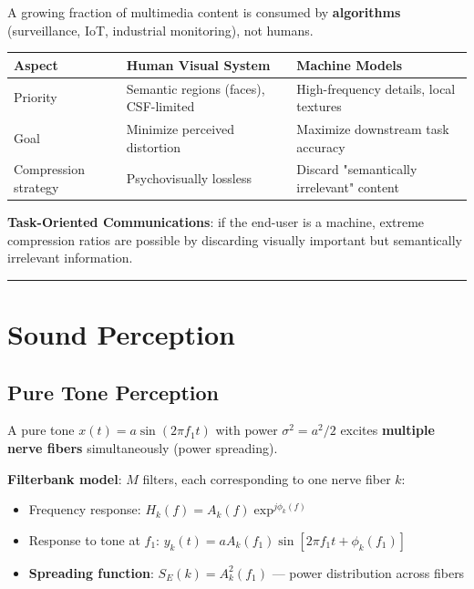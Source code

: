 A growing fraction of multimedia content is consumed by \textbf{algorithms} (surveillance, IoT, industrial monitoring), not humans.

\begin{center}
\begin{tabular}{|l|l|l|}
\hline
\textbf{Aspect} & \textbf{Human Visual System} & \textbf{Machine Models} \\ \hline
Priority & Semantic regions (faces), CSF-limited & High-frequency details, local textures \\ \hline
Goal & Minimize perceived distortion & Maximize downstream task accuracy \\ \hline
Compression strategy & Psychovisually lossless & Discard "semantically irrelevant" content \\ \hline
\end{tabular}
\end{center}

\textbf{Task-Oriented Communications}: if the end-user is a machine, extreme compression ratios are possible by discarding visually important but semantically irrelevant information.

\bigskip\hrule\bigskip

\section{Sound Perception}

\subsection{Pure Tone Perception}

A pure tone $x(t) = a\sin(2\pi f_1 t)$ with power $\sigma^2 = a^2/2$ excites \textbf{multiple nerve fibers} simultaneously (power spreading).

\textbf{Filterbank model}: $M$ filters, each corresponding to one nerve fiber $k$:
\begin{itemize}
\item Frequency response: $H_k(f) = A_k(f)\exp^{j\phi_k(f)}$
\item Response to tone at $f_1$: $y_k(t) = a A_k(f_1)\sin[2\pi f_1 t + \phi_k(f_1)]$
\item \textbf{Spreading function}: $S_E(k) = A_k^2(f_1)$ — power distribution across fibers
\end{itemize}

